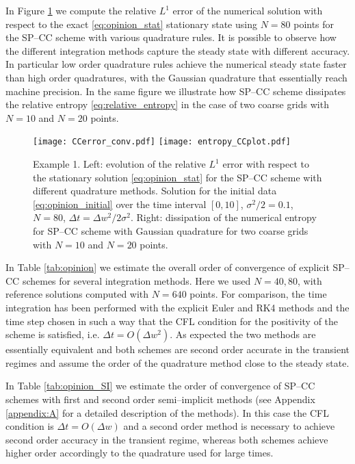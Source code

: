 \documentclass[a4paper]{article}
\theoremstyle{remark}\newtheorem{remark}{Remark}
\begin{document}
In Figure \ref{fig:example1_L1ent} we compute the relative $L^1$ error of the numerical solution with respect to the exact \eqref{eq:opinion_stat} stationary state using $N=80$ points for the SP--CC scheme with various quadrature rules. 
It is possible to observe how the different integration methods capture the steady state with different accuracy. In particular low order quadrature rules achieve the numerical steady state faster than high order quadratures, with the Gaussian quadrature that essentially reach machine precision. In the same figure we illustrate how SP--CC scheme dissipates the relative entropy \eqref{eq:relative_entropy} in the case of two coarse grids with $N=10$ and $N=20$ points. 


\begin{figure}
\centering
\texttt{[image: CCerror\_conv.pdf]}
\texttt{[image: entropy\_CCplot.pdf]}
\caption{{Example 1}. Left: evolution of the relative $L^1$ error with respect to the stationary solution \eqref{eq:opinion_stat} for the SP--CC scheme with different quadrature methods. Solution for the initial data \eqref{eq:opinion_initial} over the time interval $[0,10]$, $\sigma^2/2=0.1$, $N=80$, $\Delta t = \Delta w^2/2\sigma^2$. Right: dissipation of the numerical entropy for SP--CC scheme with Gaussian quadrature for two coarse grids with $N=10$ and $N=20$ points. }\label{fig:example1_L1ent}
\end{figure}

In Table \ref{tab:opinion} we estimate the overall order of convergence of explicit SP--CC schemes for several integration methods. Here we used $N=40,80$, with reference solutions computed with $N=640$ points. For comparison, the time integration has been performed with the explicit Euler and RK4 methods and the time step chosen in such a way that the CFL condition for the positivity of the scheme is satisfied, i.e. $\Delta t= O(\Delta w^2)$. As expected the two methods are essentially equivalent and both schemes are second order accurate in the transient regimes and assume the order of the quadrature method close to the steady state. 

In Table \ref{tab:opinion_SI}  we estimate the order of convergence of SP--CC schemes with first and second order semi--implicit methods (see Appendix \ref{appendix:A} for a detailed description of the methods). In this case the CFL condition is $\Delta t= O(\Delta w)$ and a second order method is necessary to achieve second order accuracy in the transient regime, whereas both schemes achieve higher order accordingly to the quadrature used for large times.
\end{document}

